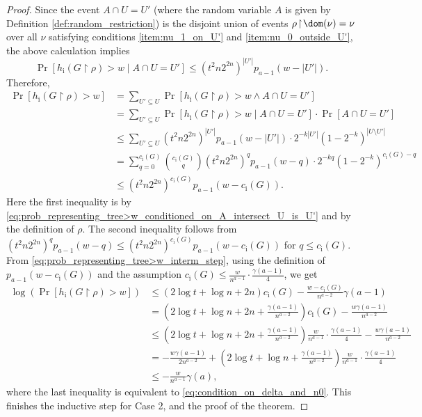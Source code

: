 \begin{proof}
Since the event $A \cap U = U'$ (where the random variable $A$ is given by Definition \ref{def:random_restriction}) is the disjoint union of events $\rho \! \restriction \! \dom(\nu) = \nu$ over all $\nu$ satisfying conditions \ref{item:nu_1_on_U'} and \ref{item:nu_0_outside_U'}, the above calculation implies 
\begin{equation}
\label{eq:prob_representing_tree>w_conditioned_on_A_intersect_U_is_U'}
 \Pr[h_{\text{i}}(G \! \restriction \! \rho) > w \mid A \cap U = U'] \leq  \left(t^2 n 2^{2n} \right)^{|U'|} p_{a-1}(w - |U'|).
\end{equation}
Therefore,
\begin{align}
 \Pr[h_{\text{i}}(G \! \restriction \! \rho) > w] & = \sum_{U' \subseteq U} \Pr[h_{\text{i}}(G \! \restriction \! \rho) > w \land A \cap U = U'] \nonumber \\
& = \sum_{U' \subseteq U} \Pr[h_{\text{i}}(G \! \restriction \! \rho) > w \mid A \cap U = U'] \cdot \Pr[A \cap U = U'] \nonumber \\
& \leq \sum_{U' \subseteq U}  \left(t^2 n 2^{2n} \right)^{|U'|} p_{a-1}(w - |U'|) \cdot 2^{-k |U'|} \left( 1 - 2^{-k} \right)^{|U \setminus U'|}  \nonumber \\
& = \sum_{q = 0}^{c_{\text{i}}(G)}  \binom{c_{\text{i}}(G)}{q} \left(t^2 n 2^{2n} \right)^{q} p_{a-1}(w - q) \cdot 2^{-kq} \left( 1 - 2^{-k} \right)^{c_{\text{i}}(G) - q}  \nonumber \\
& \leq \left(t^2 n 2^{2n} \right)^{c_{\text{i}}(G)} p_{a-1}(w - c_{\text{i}}(G)). \label{eq:prob_representing_tree>w_interm_step}
\end{align}
Here the first inequality is by \ref{eq:prob_representing_tree>w_conditioned_on_A_intersect_U_is_U'} and by the definition of $\rho$. The second inequality follows from $\left(t^2 n 2^{2n} \right)^{q} p_{a-1}(w - q) \leq \left(t^2 n 2^{2n} \right)^{c_{\text{i}}(G)} p_{a-1}(w - c_{\text{i}}(G))$ for $q \leq c_{\text{i}}(G)$. From \ref{eq:prob_representing_tree>w_interm_step}, using the definition of $p_{a-1}(w - c_{\text{i}}(G))$ and the assumption $c_{\text{i}}(G) \leq \frac{w}{n^{a-1}} \cdot \frac{\gamma(a-1)}{4}$, we get
\begin{align*}
\log (\Pr[h_{\text{i}}(G \! \restriction \! \rho) > w]) & \leq \left( 2 \log t + \log n + 2n \right) c_{\text{i}}(G) - \frac{w - c_{\text{i}}(G)}{n^{a-2}} \gamma(a-1) \\
& = \left(2 \log t + \log n + 2n + \frac{\gamma(a-1)}{n^{a-2}} \right) c_{\text{i}}(G) - \frac{w \gamma(a-1)}{n^{a-2}} \\
& \leq \left(2 \log t + \log n + 2n + \frac{\gamma(a-1)}{n^{a-2}} \right) \frac{w}{n^{a-1}} \cdot \frac{\gamma(a-1)}{4} - \frac{w \gamma(a-1)}{n^{a-2}} \\
& = - \frac{w \gamma(a-1)}{2n^{a-2}} + \left(2 \log t + \log n + \frac{\gamma(a-1)}{n^{a-2}} \right) \frac{w}{n^{a-1}} \cdot \frac{\gamma(a-1)}{4} \\
& \leq  - \frac{w}{n^{a-1}} \gamma(a),
\end{align*}
where the last inequality is equivalent to \ref{eq:condition_on_delta_and_n0}. This finishes the inductive step for Case 2, and the proof of the theorem.
\end{proof}

